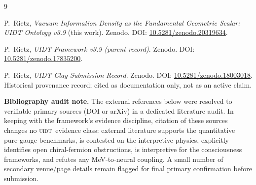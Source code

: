 \documentclass[12pt,a4paper,twoside]{article}
\theoremstyle{plain}
\theoremstyle{definition}
\theoremstyle{remark}
\newcommand{\UIDT}{\textsc{uidt}}
\begin{document}
\newpage
\begin{thebibliography}{9}
\footnotesize

P.~Rietz, \textit{Vacuum Information Density as the Fundamental Geometric Scalar: UIDT Ontology v3.9} (this work). Zenodo. DOI: \href{https://doi.org/10.5281/zenodo.20319634}{10.5281/zenodo.20319634}.

P.~Rietz, \textit{UIDT Framework v3.9 (parent record)}. Zenodo. DOI: \href{https://doi.org/10.5281/zenodo.17835200}{10.5281/zenodo.17835200}.

P.~Rietz, \textit{UIDT Clay-Submission Record}. Zenodo. DOI: \href{https://doi.org/10.5281/zenodo.18003018}{10.5281/zenodo.18003018}. Historical provenance record; cited as documentation only, not as an active claim.

\textbf{Bibliography audit note.} The external references below were resolved to verifiable primary sources (DOI or arXiv) in a dedicated literature audit. In keeping with the framework's evidence discipline, citation of these sources changes no \UIDT\ evidence class: external literature supports the quantitative pure-gauge benchmarks, is contested on the interpretive physics, explicitly identifies open chiral-fermion obstructions, is interpretive for the consciousness frameworks, and refutes any MeV-to-neural coupling. A small number of secondary venue/page details remain flagged for final primary confirmation before submission.


\end{thebibliography}
\end{document}
